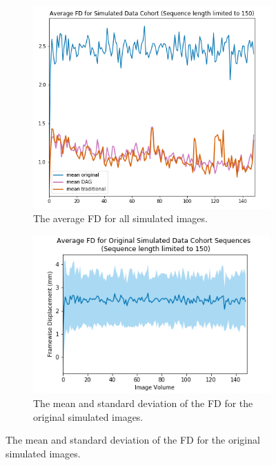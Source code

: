 \begin{figure}[t]
	\begin{subfigure}{0.45\textwidth}
		\centering
		\includegraphics[width=1\textwidth]{6/figures/spectr_fd_all_150_avg.png}
		\caption{The average FD for all simulated images.}
	\end{subfigure}%
	\vspace{0.1\textwidth}
	\begin{subfigure}{0.45\textwidth}
		\centering
		\includegraphics[width=1\textwidth]{6/figures/spectr-bold-fd-150.png}
		\caption{The mean and standard deviation of the FD for the original simulated images.}
	\end{subfigure}
	

\end{figure}
